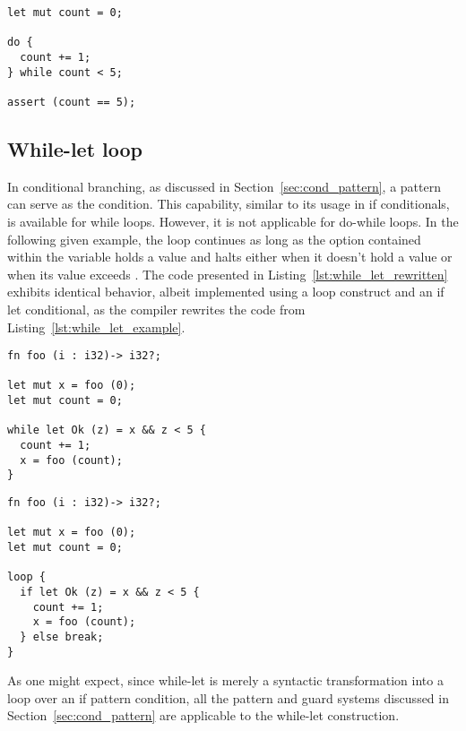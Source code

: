 \begin{lstlisting}[style=coloredverbatim, caption=Simple do while loop, label=lst:simple_do_while_loop]
let mut count = 0;

do {
  count += 1;
} while count < 5;

assert (count == 5);
\end{lstlisting}



\subsection{While-let loop}
\label{sec:while_let_loop}

In conditional branching, as discussed in Section~\ref{sec:cond_pattern}, a
pattern can serve as the condition. This capability, similar to its usage in if
conditionals, is available for while loops. However, it is not applicable for
do-while loops. In the following given example, the loop continues as long as
the option contained within the variable  holds a value and halts
either when it doesn't hold a value or when its value exceeds . The
code presented in Listing~\ref{lst:while_let_rewritten} exhibits identical
behavior, albeit implemented using a loop construct and an if let conditional,
as the compiler rewrites the code from Listing~\ref{lst:while_let_example}.

\begin{lstlisting}[style=coloredverbatim, caption=While-let example, label=lst:while_let_example]
fn foo (i : i32)-> i32?;

let mut x = foo (0);
let mut count = 0;

while let Ok (z) = x && z < 5 {
  count += 1;
  x = foo (count);
}
\end{lstlisting}

\begin{lstlisting}[style=coloredverbatim, caption=While-let rewritten using loop and if-let, label=lst:while_let_rewritten]
fn foo (i : i32)-> i32?;

let mut x = foo (0);
let mut count = 0;

loop {
  if let Ok (z) = x && z < 5 {
    count += 1;
    x = foo (count);
  } else break;
}
\end{lstlisting}

As one might expect, since while-let is merely a syntactic transformation into a
loop over an if pattern condition, all the pattern and guard systems discussed
in Section~\ref{sec:cond_pattern} are applicable to the while-let construction.

